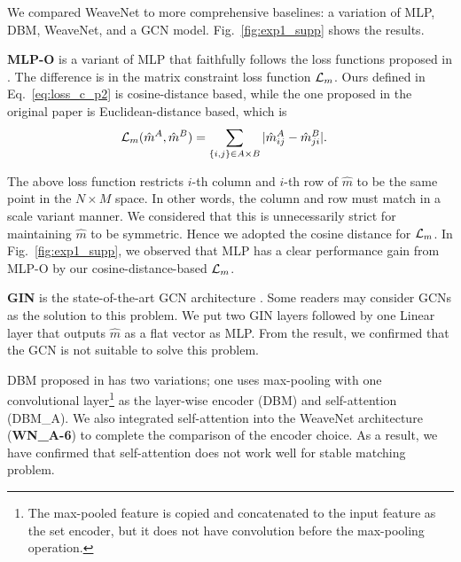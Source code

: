 We compared WeaveNet to more comprehensive baselines: a variation of MLP, DBM, WeaveNet, and a GCN model.
Fig.~\ref{fig:exp1_supp} shows the results.

{\bf MLP-O} is a variant of MLP that faithfully follows the loss functions proposed in \cite{harvard2019}.
The difference is in the matrix constraint loss function ${\mathcal L}_m$.
Ours defined in Eq.~\eqref{eq:loss_c_p2} is cosine-distance based, while the one proposed in the original paper is Euclidean-distance based, which is
\begin{equation}
\begin{split}
{\mathcal L}_m(\hat{m}^A,\hat{m}^B) & = \sum_{\{i,j\}\in A\times B} |\hat{m}^A_{ij} - \hat{m}^B_{ji} |.
\end{split}
\label{eq:loss_c_orig}
\end{equation}

The above loss function restricts $i$-th column and $i$-th row of $\hat{m}$ to be the same point in the $N\times M$ space. In other words, the column and row must match in a scale variant manner.
We considered that this is unnecessarily strict for maintaining $\hat{m}$ to be symmetric. Hence we adopted the cosine distance for ${\mathcal L}_m$. 
In Fig.~\ref{fig:exp1_supp}, we observed that MLP has a clear performance gain from MLP-O by our cosine-distance-based ${\mathcal L}_m$.

{\bf GIN} is the state-of-the-art GCN architecture \cite{xu2018how}.
Some readers may consider GCNs as the solution to this problem. 
We put two GIN layers followed by one Linear layer that outputs $\hat{m}$ as a flat vector as MLP. From the result, we confirmed that the GCN is not suitable to solve this problem.

DBM proposed in \cite{gibbons2019deep} has two variations; one uses max-pooling with one convolutional layer\footnote{The max-pooled feature is copied and concatenated to the input feature as the set encoder, but it does not have convolution before the max-pooling operation.} as the layer-wise encoder (DBM) and self-attention (DBM\_A). 
We also integrated self-attention into the WeaveNet architecture ({\bf WN\_A-6}) to complete the comparison of the encoder choice. 
As a result, we have confirmed that self-attention does not work well for stable matching problem.


